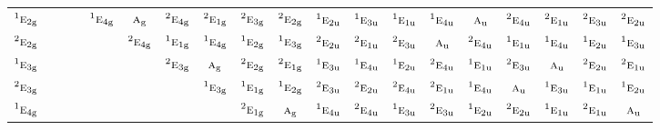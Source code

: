 \documentclass[10pt,a4paper]{article}
\numberwithin{equation}{section}
\newcommand{\irr}[1]{\text{\normalfont\scshape #1}}
\newcommand{\conjpair}[1]{{}^{#1}}
\newcommand{\ptag}[1]{\mathrm{#1}}
\begin{document}
{\begin{longtable}{@{}lcccccccccccccccccc@{}}
$\conjpair{1}\irr{e}_{2\ptag{g}}$ &  &  &  & $\conjpair{1}\irr{e}_{4\ptag{g}}$ & $\irr{a}_{\ptag{g}}$ & $\conjpair{2}\irr{e}_{4\ptag{g}}$ & $\conjpair{2}\irr{e}_{1\ptag{g}}$ & $\conjpair{2}\irr{e}_{3\ptag{g}}$ & $\conjpair{2}\irr{e}_{2\ptag{g}}$ & $\conjpair{1}\irr{e}_{2\ptag{u}}$ & $\conjpair{1}\irr{e}_{3\ptag{u}}$ & $\conjpair{1}\irr{e}_{1\ptag{u}}$ & $\conjpair{1}\irr{e}_{4\ptag{u}}$ & $\irr{a}_{\ptag{u}}$ & $\conjpair{2}\irr{e}_{4\ptag{u}}$ & $\conjpair{2}\irr{e}_{1\ptag{u}}$ & $\conjpair{2}\irr{e}_{3\ptag{u}}$ & $\conjpair{2}\irr{e}_{2\ptag{u}}$\\
$\conjpair{2}\irr{e}_{2\ptag{g}}$ &  &  &  &  & $\conjpair{2}\irr{e}_{4\ptag{g}}$ & $\conjpair{1}\irr{e}_{1\ptag{g}}$ & $\conjpair{1}\irr{e}_{4\ptag{g}}$ & $\conjpair{1}\irr{e}_{2\ptag{g}}$ & $\conjpair{1}\irr{e}_{3\ptag{g}}$ & $\conjpair{2}\irr{e}_{2\ptag{u}}$ & $\conjpair{2}\irr{e}_{1\ptag{u}}$ & $\conjpair{2}\irr{e}_{3\ptag{u}}$ & $\irr{a}_{\ptag{u}}$ & $\conjpair{2}\irr{e}_{4\ptag{u}}$ & $\conjpair{1}\irr{e}_{1\ptag{u}}$ & $\conjpair{1}\irr{e}_{4\ptag{u}}$ & $\conjpair{1}\irr{e}_{2\ptag{u}}$ & $\conjpair{1}\irr{e}_{3\ptag{u}}$\\
$\conjpair{1}\irr{e}_{3\ptag{g}}$ &  &  &  &  &  & $\conjpair{2}\irr{e}_{3\ptag{g}}$ & $\irr{a}_{\ptag{g}}$ & $\conjpair{2}\irr{e}_{2\ptag{g}}$ & $\conjpair{2}\irr{e}_{1\ptag{g}}$ & $\conjpair{1}\irr{e}_{3\ptag{u}}$ & $\conjpair{1}\irr{e}_{4\ptag{u}}$ & $\conjpair{1}\irr{e}_{2\ptag{u}}$ & $\conjpair{2}\irr{e}_{4\ptag{u}}$ & $\conjpair{1}\irr{e}_{1\ptag{u}}$ & $\conjpair{2}\irr{e}_{3\ptag{u}}$ & $\irr{a}_{\ptag{u}}$ & $\conjpair{2}\irr{e}_{2\ptag{u}}$ & $\conjpair{2}\irr{e}_{1\ptag{u}}$\\
$\conjpair{2}\irr{e}_{3\ptag{g}}$ &  &  &  &  &  &  & $\conjpair{1}\irr{e}_{3\ptag{g}}$ & $\conjpair{1}\irr{e}_{1\ptag{g}}$ & $\conjpair{1}\irr{e}_{2\ptag{g}}$ & $\conjpair{2}\irr{e}_{3\ptag{u}}$ & $\conjpair{2}\irr{e}_{2\ptag{u}}$ & $\conjpair{2}\irr{e}_{4\ptag{u}}$ & $\conjpair{2}\irr{e}_{1\ptag{u}}$ & $\conjpair{1}\irr{e}_{4\ptag{u}}$ & $\irr{a}_{\ptag{u}}$ & $\conjpair{1}\irr{e}_{3\ptag{u}}$ & $\conjpair{1}\irr{e}_{1\ptag{u}}$ & $\conjpair{1}\irr{e}_{2\ptag{u}}$\\
$\conjpair{1}\irr{e}_{4\ptag{g}}$ &  &  &  &  &  &  &  & $\conjpair{2}\irr{e}_{1\ptag{g}}$ & $\irr{a}_{\ptag{g}}$ & $\conjpair{1}\irr{e}_{4\ptag{u}}$ & $\conjpair{2}\irr{e}_{4\ptag{u}}$ & $\conjpair{1}\irr{e}_{3\ptag{u}}$ & $\conjpair{2}\irr{e}_{3\ptag{u}}$ & $\conjpair{1}\irr{e}_{2\ptag{u}}$ & $\conjpair{2}\irr{e}_{2\ptag{u}}$ & $\conjpair{1}\irr{e}_{1\ptag{u}}$ & $\conjpair{2}\irr{e}_{1\ptag{u}}$ & $\irr{a}_{\ptag{u}}$\\

\end{longtable}}
\end{document}
